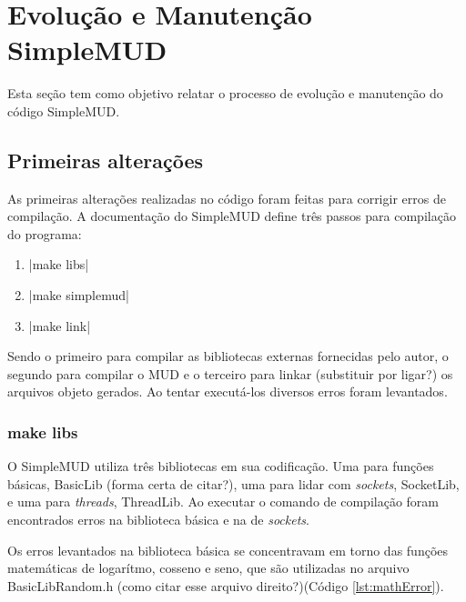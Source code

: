 \section[Evolução e Manutenção SimpleMUD]{Evolução e Manutenção SimpleMUD}
\label{section:evolSimpleMUD}

Esta seção tem como objetivo relatar o processo de evolução e manutenção do código SimpleMUD.

\subsection{Primeiras alterações}

As primeiras alterações realizadas no código foram feitas para corrigir erros de compilação. 
A documentação do SimpleMUD define três passos para compilação do programa:

\begin{enumerate}
    \item {}|make libs|
    \item {}|make simplemud|
    \item {}|make link|
\end{enumerate}

Sendo o primeiro para compilar as bibliotecas externas fornecidas pelo autor, 
o segundo para compilar o MUD e o terceiro para linkar (substituir por ligar?) 
os arquivos objeto gerados. Ao tentar executá-los diversos erros foram levantados.

\subsubsection{make libs}

O SimpleMUD utiliza três bibliotecas em sua codificação. 
Uma para funções básicas, BasicLib (forma certa de citar?), uma para lidar com \textit{sockets}, 
SocketLib, e uma para \textit{threads}, ThreadLib. Ao executar o comando de compilação 
foram encontrados erros na biblioteca básica e na de \textit{sockets}.


Os erros levantados na biblioteca básica se concentravam em torno das funções matemáticas 
de logarítmo, cosseno e seno, que são utilizadas no arquivo BasicLibRandom.h 
(como citar esse arquivo direito?)(Código \ref{lst:mathError}).

